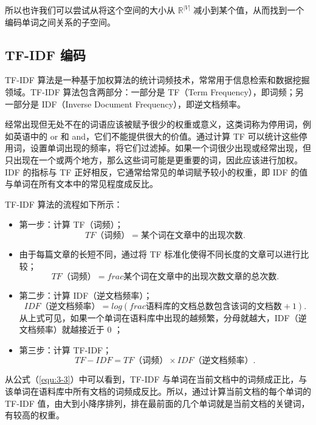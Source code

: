 所以也许我们可以尝试从将这个空间的大小从 $\mathbb{R}^{|V|}$ 减小到某个值，从而找到一个编码单词之间关系的子空间。

\subsection{TF-IDF 编码}
TF-IDF 算法是一种基于加权算法的统计词频技术，常常用于信息检索和数据挖掘领域。TF-IDF 算法包含两部分：一部分是 TF（Term Frequency），即词频；另一部分是 IDF（Inverse Document Frequency），即逆文档频率。

经常出现但无处不在的词语应该被赋予很少的权重或意义，这类词称为停用词，例如英语中的 or 和 and，它们不能提供很大的价值。通过计算 TF 可以统计这些停用词，设置单词出现的频率，将它们过滤掉。如果一个词很少出现或经常出现，但只出现在一个或两个地方，那么这些词可能是更重要的词，因此应该进行加权。IDF 的指标与 TF 正好相反，它通常给常见的单词赋予较小的权重，即 IDF 的值与单词在所有文本中的常见程度成反比。

TF-IDF 算法的流程如下所示：
\begin{itemize}
    \item 第一步：计算 TF（词频）；
    \begin{equation}
        TF\mbox{（词频）}= \mbox{某个词在文章中的出现次数}.
    \end{equation}
    \item 由于每篇文章的长短不同，通过将 TF 标准化使得不同长度的文章可以进行比较；
    \begin{equation}
        TF\mbox{（词频）}= frac{\mbox{某个词在文章中的出现次数}}{\mbox{文章的总次数}}.
    \end{equation}
    \item 第二步：计算 IDF（逆文档频率）；
    \begin{equation}
        IDF\mbox{（逆文档频率）} = log(frac{\mbox{语料库的文档总数}}{\mbox{包含该词的文档数}+1}). 
    \end{equation}
    从上式可见，如果一个单词在语料库中出现的越频繁，分母就越大，IDF（逆文档频率）就越接近于 0 ；
    \item 第三步：计算 TF-IDF；
    \begin{equation}
        TF-IDF = TF\mbox{（词频）} \times IDF\mbox{（逆文档频率）}. 
    \label{equ:3-3}
    \end{equation}
\end{itemize} 

从公式（\ref{equ:3-3}）中可以看到，TF-IDF 与单词在当前文档中的词频成正比，与该单词在语料库中所有文档的词频成反比。所以，通过计算当前文档的每个单词的TF-IDF 值，由大到小降序排列，排在最前面的几个单词就是当前文档的关键词，有较高的权重。

